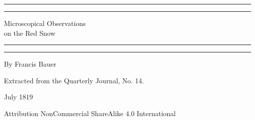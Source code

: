 \documentclass[a4paper, 12pt, oneside]{article}
\begin{document}
\begin{titlepage} %
	\centering %
	\scshape %

	
	\rule{\textwidth}{1.6pt}\vspace*{-\baselineskip}\vspace*{2pt} %
	\rule{\textwidth}{0.4pt} %
	
	\vspace{1.5\baselineskip} %
	
	{\LARGE Microscopical Observations\\ on the Red Snow }
	
	\vspace{1\baselineskip} %

	\rule{\textwidth}{0.4pt}\vspace*{-\baselineskip}\vspace{3.2pt} %
	\rule{\textwidth}{1.6pt} %
	
	\vspace{1\baselineskip} %

	
	{By Francis Bauer} %
	
	\vspace*{1\baselineskip} %
	
	{Extracted from the Quarterly Journal, No. 14.} %
	
	\vspace*{1\baselineskip} %
	
    \vspace*{\fill}

	{\small\scshape }

    July 1819
	
	{\small Attribution NonCommercial ShareAlike 4.0 International } %
\end{titlepage}
\setlength{\parskip}{1mm plus1mm minus1mm}
\clearpage
\end{document}
